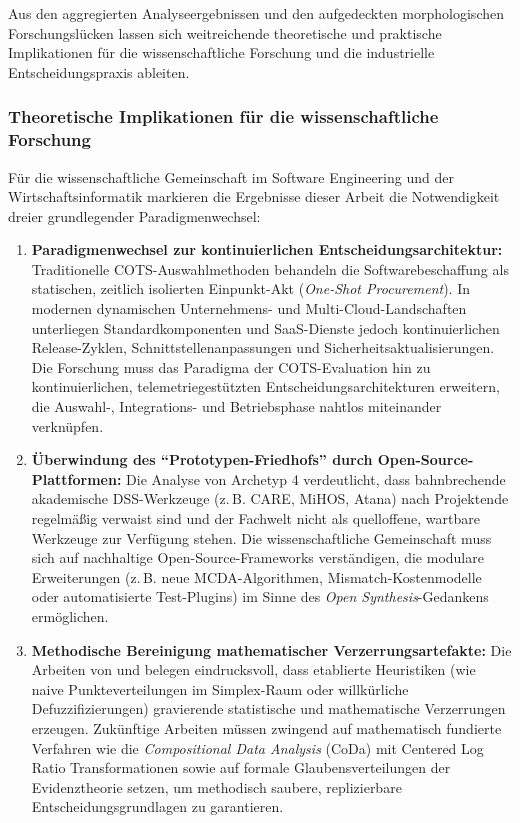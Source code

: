 Aus den aggregierten Analyseergebnissen und den aufgedeckten morphologischen Forschungslücken lassen sich weitreichende theoretische und praktische Implikationen für die wissenschaftliche Forschung und die industrielle Entscheidungspraxis ableiten.

\subsubsection{Theoretische Implikationen für die wissenschaftliche Forschung}
\label{subsubsec:theoretische_implikationen}

Für die wissenschaftliche Gemeinschaft im Software Engineering und der Wirtschaftsinformatik markieren die Ergebnisse dieser Arbeit die Notwendigkeit dreier grundlegender Paradigmenwechsel:

\begin{enumerate}[label=\textbf{\arabic*.}, leftmargin=*]
  \item \textbf{Paradigmenwechsel zur kontinuierlichen Entscheidungsarchitektur:} \newline
  Traditionelle COTS-Auswahlmethoden behandeln die Softwarebeschaffung als statischen, zeitlich isolierten Einpunkt-Akt (\textit{One-Shot Procurement}). In modernen dynamischen Unternehmens- und Multi-Cloud-Landschaften unterliegen Standardkomponenten und SaaS-Dienste jedoch kontinuierlichen Release-Zyklen, Schnittstellenanpassungen und Sicherheitsaktualisierungen. Die Forschung muss das Paradigma der COTS-Evaluation hin zu kontinuierlichen, telemetriegestützten Entscheidungsarchitekturen erweitern, die Auswahl-, Integrations- und Betriebsphase nahtlos miteinander verknüpfen.
  
  \item \textbf{Überwindung des \enquote{Prototypen-Friedhofs} durch Open-Source-Plattformen:} \newline
  Die Analyse von Archetyp 4 verdeutlicht, dass bahnbrechende akademische DSS-Werkzeuge (z.\,B. CARE, MiHOS, Atana) nach Projektende regelmäßig verwaist sind und der Fachwelt nicht als quelloffene, wartbare Werkzeuge zur Verfügung stehen. Die wissenschaftliche Gemeinschaft muss sich auf nachhaltige Open-Source-Frameworks verständigen, die modulare Erweiterungen (z.\,B. neue MCDA-Algorithmen, Mismatch-Kostenmodelle oder automatisierte Test-Plugins) im Sinne des \textit{Open Synthesis}-Gedankens ermöglichen.
  
  \item \textbf{Methodische Bereinigung mathematischer Verzerrungsartefakte:} \newline
  Die Arbeiten von \textcite{UK2X9C4W} und \textcite{LNQHES84} belegen eindrucksvoll, dass etablierte Heuristiken (wie naive Punkteverteilungen im Simplex-Raum oder willkürliche Defuzzifizierungen) gravierende statistische und mathematische Verzerrungen erzeugen. Zukünftige Arbeiten müssen zwingend auf mathematisch fundierte Verfahren wie die \textit{Compositional Data Analysis} (CoDa) mit Centered Log Ratio Transformationen sowie auf formale Glaubensverteilungen der Evidenztheorie setzen, um methodisch saubere, replizierbare Entscheidungsgrundlagen zu garantieren.
\end{enumerate}

